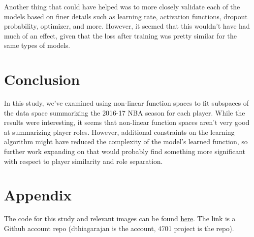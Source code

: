 \documentclass[12pt]{article}
\begin{document}
    Another thing that could have helped was to more closely validate each of the models based on finer details such as learning rate, activation functions, dropout probability, optimizer, and more. However, it seemed that this wouldn't have had much of an effect, given that the loss after training was pretty similar for the same types of models.
    \section{Conclusion}
    In this study, we've examined using non-linear function spaces to fit subspaces of the data space summarizing the 2016-17 NBA season for each player. While the results were interesting, it seems that non-linear function spaces aren't very good at summarizing player roles. However, additional constraints on the learning algorithm might have reduced the complexity of the model's learned function, so further work expanding on that would probably find something more significant with respect to player similarity and role separation.
    \section{Appendix}
    The code for this study and relevant images can be found \href{https://github.com/dthiagarajan/4701_project}{here}. The link is a Github account repo (dthiagarajan is the account, 4701 project is the repo).
    
\end{document}
